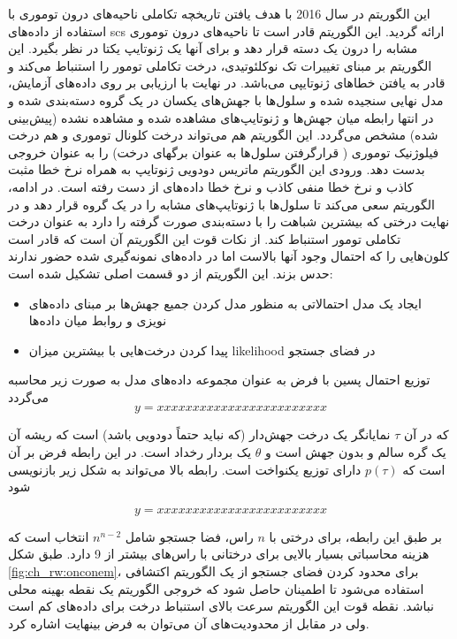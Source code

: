 این الگوریتم در سال 2016 با هدف یافتن تاریخچه تکاملی ناحیه‌های درون توموری با استفاده از داده‌های \gls{scs} ارائه گردید. این الگوریتم قادر است تا ناحیه‌های درون توموری مشابه را درون یک دسته قرار دهد و برای آنها یک ژنوتایپ یکتا در نظر بگیرد. این الگوریتم بر مبنای تغییرات تک نوکلئوتیدی، درخت تکاملی تومور را استنباط می‌کند و قادر به یافتن خطاهای ژنوتایپی می‌باشد. در نهایت با ارزیابی بر روی داده‌های آزمایش، مدل نهایی سنجیده شده و سلول‌ها با جهش‌های یکسان در یک گروه دسته‌بندی شده و در انتها رابطه میان جهش‌ها و ژنوتایپ‌های مشاهده شده و مشاهده نشده (پیش‌بینی شده) مشخص می‌گردد. این الگوریتم هم می‌تواند درخت کلونال توموری و هم درخت فیلوژنیک توموری ( قرارگرفتن سلول‌ها به عنوان برگهای درخت) را به عنوان خروجی بدست دهد. ورودی این الگوریتم ماتریس دودویی ژنوتایپ به همراه نرخ خطا مثبت کاذب و نرخ خطا منفی کاذب و نرخ خطا داده‌های از دست رفته است. در ادامه، الگوریتم سعی می‌کند تا سلول‌ها با ژنوتایپ‌های مشابه را در یک گروه قرار دهد و در نهایت درختی که بیشترین شباهت را با دسته‌بندی صورت گرفته را دارد به عنوان درخت تکاملی تومور استنباط کند. از نکات قوت این الگوریتم آن است که قادر است کلون‌هایی را که احتمال وجود آنها بالاست اما در داده‌های نمونه‌گیری شده حضور ندارند حدس بزند. این الگوریتم از دو قسمت اصلی تشکیل شده است: 
\begin{itemize}
	\item ایجاد یک مدل احتمالاتی به منظور مدل کردن جمیع جهش‌ها بر مبنای داده‌های نویزی و روابط میان داده‌ها 
	\item پیدا کردن درخت‌هایی با بیشترین میزان \gls{likelihood} در فضای جستجو 
\end{itemize}
توزیع احتمال پسین با فرض  به عنوان مجموعه داده‌های مدل به صورت زیر محاسبه می‌گردد
\begin{equation}
	y=xxxxxxxxxxxxxxxxxxxxxxxx
\end{equation}

که در آن $\tau$ نمایانگر یک درخت جهش‌دار (که نباید حتماً دودویی باشد) است که ریشه آن یک گره سالم و بدون جهش است و $\theta$ یک بردار رخداد است. در این رابطه فرض بر آن است که $p(\tau)$ دارای توزیع یکنواخت است. رابطه بالا می‌تواند به شکل زیر بازنویسی شود

\begin{equation}
	y=xxxxxxxxxxxxxxxxxxxxxxxx
\end{equation}

بر طبق این رابطه، برای درختی با  $n$ راس، فضا جستجو شامل $n^{n-2}$  انتخاب است که هزینه محاسباتی بسیار بالایی برای درختانی با راس‌های بیشتر از 9 دارد. طبق شکل \ref{fig:ch_rw:onconem}، برای محدود کردن فضای جستجو از یک الگوریتم اکتشافی استفاده می‌شود تا اطمینان حاصل شود که خروجی الگوریتم یک نقطه بهینه محلی نباشد. نقطه قوت این الگوریتم سرعت بالای استنباط درخت برای داده‌های کم است ولی در مقابل از محدودیت‌های آن می‌توان به فرض بینهایت اشاره کرد.

